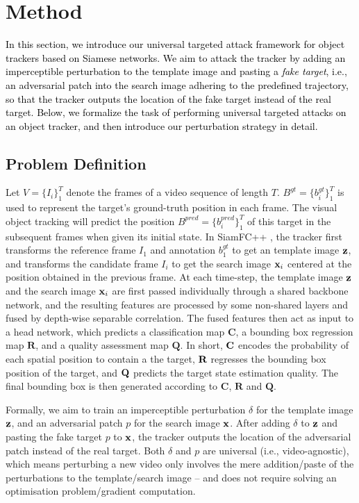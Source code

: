 \documentclass{article}
\begin{document}
\section{Method}

\textcolor{black}{In this section, we introduce our universal targeted attack framework for object trackers based on Siamese networks. We aim to attack the tracker by adding an imperceptible perturbation to the template image and pasting a \textit{fake target}, i.e., an adversarial patch into the search image adhering to the predefined trajectory, so that the tracker outputs the location of the fake target instead of the real target. Below, we formalize the task of performing universal targeted attacks on an object tracker, and then introduce our perturbation strategy in detail.}
 
\subsection{Problem Definition}

Let $V=\{I_i\}_1^T$ denote the frames of a video sequence of length $T$.
$B^{gt}=\{b^{gt}_i\}_1^T$ is used to represent the target's ground-truth position in each frame.
The visual object tracking will predict the position $B^{pred}=\{b^{pred}_i\}_1^T$ of this target in the subsequent frames when given its initial state.
In SiamFC++ \cite{SiamFC++}, the tracker first transforms the reference frame $I_1$ and annotation $b_1^{gt}$ to get an template image $\textbf z$, and transforms the candidate frame $I_i$ to get the search image $\textbf x_i$ centered at the position obtained in the previous frame.
At each time-step, the template image $\textbf z$ and the search image $\textbf x_i$ are first passed individually through a shared backbone network, and the resulting features are processed by some non-shared layers and fused by depth-wise separable correlation. The fused features then act as input to a head network, which predicts a classification map $\textbf{C}$, a bounding box regression map $\textbf{R}$, and a quality assessment map $\textbf{Q}$. In short, $\textbf C$ encodes the probability of each spatial position to contain a the target, $\textbf R$ regresses the bounding box position of the target, and $\textbf Q$ predicts the target state estimation quality. The final bounding box is then generated according to $\textbf{C}$, $\textbf{R}$ and $\textbf{Q}$.

Formally, we aim to train an imperceptible perturbation $\delta$ for the template image $\textbf z$, and an adversarial patch $p$ for the search image $\textbf x$. After adding $\delta$ to $\textbf z$ and pasting the fake target $p$ to $\textbf x$, the tracker outputs the location of the adversarial patch instead of the real target.
Both $\delta$ and $p$ are universal (i.e., video-agnostic), which means perturbing a new video only involves the mere addition/paste of the perturbations to the template/search image -- and does not require solving an optimisation problem/gradient computation.
\end{document}
